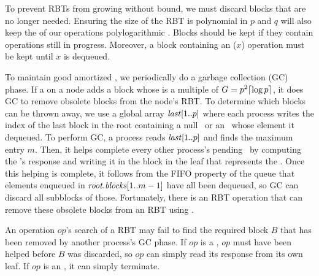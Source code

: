 To prevent RBTs from growing without bound, we must discard
blocks that are no longer needed.
Ensuring the size of the RBT is polynomial in $p$ and $q$ will 
also keep the  of our operations polylogarithmic .
Blocks should be kept if they contain operations still in progress.
Moreover, a block containing an ($x$) operation must be kept until $x$ is dequeued.

To maintain good amortized , we periodically do a garbage collection (GC) phase.
If a  on a node adds a block whose  is a multiple of $G=p^2\lceil \log p \rceil$, it does GC to remove obsolete blocks from the node's RBT.
To determine which blocks can be thrown away, we use a global array $\mbox{\textnormal{\textit{last}}}[1..p]$ where 
each process writes the index of the last block in the root
containing a null \dequeue\ or an \enqueue\ whose element it dequeued.
To perform GC, a process reads $\mbox{\textnormal{\textit{last}}}[1..p]$ and finds the maximum entry $m$.
Then, it helps complete every other process's pending \dequeue\ by 
computing the \dequeue's response and writing it in the block in the leaf that represents the \dequeue.
Once this helping is complete, it follows from the FIFO property of the queue that elements enqueued 
in $\mbox{\textit{root.blocks}}[1..m-1]$ have all been dequeued, so GC can discard all subblocks of those.
Fortunately, there is an  RBT  operation that can remove
these obsolete blocks from an RBT using  \cite[Sec.~4.2]{Tar83}.

An operation $op$'s search of a RBT may fail to find the required block $B$ that has been removed 
by another process's GC phase.  If $op$
is a \dequeue, $op$ must have been helped before $B$ was discarded, so $op$ can simply read its response from
its own leaf.  If $op$ is an \enqueue, it can simply terminate.


